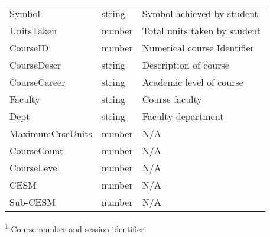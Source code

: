 \begin{table}[H]
\begin{threeparttable}
\begin{tabularx}{\textwidth}{>{\hsize=0.8\hsize}X>{\hsize=0.6\hsize}X>{\hsize=1.6\hsize}X}
            Symbol             & string            & Symbol achieved by student                       \\
            UnitsTaken         & number            & Total units taken by student                     \\
            CourseID           & number            & Numerical course Identifier                      \\
            CourseDescr        & string            & Description of course                            \\
            CourseCareer       & string            & Academic level of course                         \\
            Faculty            & string            & Course faculty                                   \\
            Dept               & string            & Faculty department                               \\
            MaximumCrseUnits   & number            & N/A                                              \\
            CourseCount        & number            & N/A                                              \\
            CourseLevel        & number            & N/A                                              \\
            CESM               & number            & N/A                                              \\
            Sub-CESM           & number            & N/A                                              \\
            \bottomrule
        \end{tabularx}
        \scriptsize
        \begin{tablenotes}
            \item[\textsuperscript{1}]Course number and session identifier
        \end{tablenotes}
    \end{threeparttable}
\end{table}